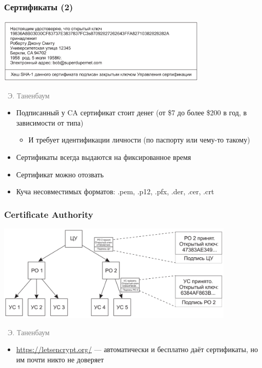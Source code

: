 \documentclass[xetex,mathserif,serif]{beamer}
\newcommand{\attribution}[1] {
\vspace{-5mm}\begin{flushright}\begin{scriptsize}\textcolor{gray}{\textcopyright\, #1}\end{scriptsize}\end{flushright}
}
\begin{document}
	\begin{frame}
		\frametitle{Сертификаты (2)}
		\begin{center}
			\includegraphics[width=0.75\textwidth]{certificate.png}
			\attribution{Э. Таненбаум}
		\end{center}
		\begin{itemize}
			\item Подписанный у CA сертификат стоит денег (от \$7 до более \$200 в год, в зависимости от типа)
			\begin{itemize}
				\item И требует идентификации личности (по паспорту или чему-то такому)
			\end{itemize}
			\item Сертификаты всегда выдаются на фиксированное время
			\item Сертификат можно отозвать
			\item Куча несовместимых форматов: .pem, .p12, .pfx, .der, .cer, .crt
		\end{itemize}
	\end{frame}

	\begin{frame}
		\frametitle{Certificate Authority}
		\begin{center}
			\includegraphics[width=0.85\textwidth]{certHierarchy.png}
			\attribution{Э. Таненбаум}
		\end{center}
		\begin{itemize}
			\item \url{https://letsencrypt.org/} --- автоматически и бесплатно даёт сертификаты, но им почти никто не доверяет
		\end{itemize}
	\end{frame}
\end{document}
